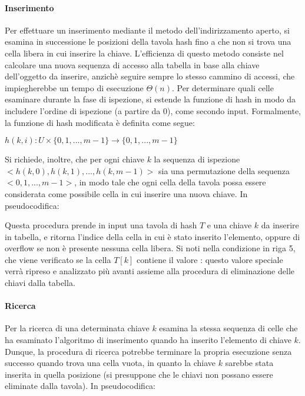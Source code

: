 \paragraph{Inserimento}
Per effettuare un inserimento mediante il metodo dell'indirizzamento aperto, si esamina in successione le posizioni della tavola hash fino a che non si trova una cella libera in cui inserire la chiave. L'efficienza di questo metodo consiste nel calcolare una nuova sequenza di accesso alla tabella in base alla chiave dell'oggetto da inserire, anzichè seguire sempre lo stesso cammino di accessi, che impiegherebbe un tempo di esecuzione \(\Theta(n)\). Per determinare quali celle esaminare durante la fase di ispezione, si estende la funzione di hash in modo da includere l'ordine di ispezione (a partire da 0), come secondo input. Formalmente, la funzione di hash modificata è definita come segue:

\(h(k,i):U\times \{0,1,...,m-1\} \to \{0,1,...,m-1\}\)

\noindent Si richiede, inoltre, che per ogni chiave \(k\) la sequenza di ispezione \(<h(k,0), h(k,1),..., h(k,m-1)>\) sia una permutazione della sequenza \(<0,1,...,m-1>\), in modo tale che ogni cella della tavola possa essere considerata come possibile cella in cui inserire una nuova chiave. In pseudocodifica:



Questa procedura prende in input una tavola di hash \(T\) e una chiave \(k\) da inserire in tabella, e ritorna l'indice della cella in cui è stato inserito l'elemento, oppure  di overflow se non è presente nessuna cella libera. Si noti nella condizione in riga 5, che viene verificato se la cella \(T[k]\) contiene il valore : questo valore speciale verrà ripreso e analizzato più avanti assieme alla procedura di eliminazione delle chiavi dalla tabella.

\paragraph{Ricerca}
Per la ricerca di una determinata chiave \(k\) esamina la stessa sequenza di celle che ha esaminato l'algoritmo di inserimento quando ha inserito l'elemento di chiave \(k\). Dunque, la procedura di ricerca potrebbe terminare la propria esecuzione senza successo quando trova una cella vuota, in quanto la chiave \(k\) sarebbe stata inserita in quella posizione (si presuppone che le chiavi non possano essere eliminate dalla tavola). In pseudocodifica:

